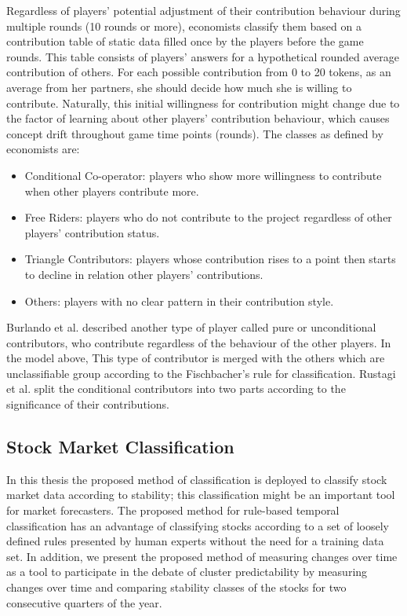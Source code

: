 Regardless of players' potential adjustment of their contribution behaviour during multiple rounds (10 rounds or more), economists \cite{Fischbacher2001} classify them based on a contribution table of static data filled once by the players before the game rounds. This table consists of players' answers for a hypothetical rounded average contribution of others. For each possible contribution from 0 to 20 tokens, as an average from her partners, she should decide how much she is willing to contribute. Naturally, this initial willingness for contribution might change due to the factor of learning about other players' contribution behaviour, which causes concept drift throughout game time points (rounds). The classes as defined by economists are:

\begin{itemize}
    \item Conditional Co-operator: players who show more willingness to contribute when other players contribute more.
    \item Free Riders: players who do not contribute to the project regardless of other players' contribution status.
    \item Triangle Contributors: players whose contribution rises to a point then starts to decline in relation other players' contributions.
    \item Others: players with no clear pattern in their contribution style.
\end{itemize}

Burlando et al. \cite{Burlando2005} described another type of player called pure or unconditional contributors, who contribute regardless of the behaviour of the other players. In the model above, This type of contributor is merged with the others which are unclassifiable group according to the Fischbacher's \cite{Fischbacher2001} rule for classification. Rustagi et al. \cite{Engel2010} split the conditional contributors into two parts according to the significance of their contributions.



\subsection{Stock Market Classification}

In this thesis the proposed method of classification is deployed to classify stock market data according to stability; this classification might be an important tool for market forecasters. The proposed method for rule-based temporal classification has an advantage of classifying stocks according to a set of loosely defined rules presented by human experts without the need for a training data set. In addition, we present the proposed method of measuring changes over time as a tool to participate in the debate of cluster predictability by measuring changes over time and comparing stability classes of the stocks for two consecutive quarters of the year.


